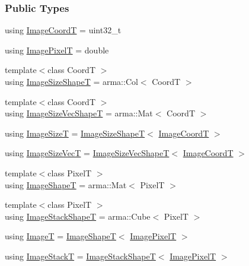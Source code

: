 \subsubsection*{Public Types}
\begin{DoxyCompactItemize}
\item 
using \hyperlink{classmappel_1_1ImageFormat2DBase_a45e9234d63c357f34ca56c72c12b9e9c}{Image\+CoordT} = uint32\+\_\+t
\item 
using \hyperlink{classmappel_1_1ImageFormat2DBase_af6bae6f78398ab1eacb39726a05adeef}{Image\+PixelT} = double
\item 
{\footnotesize template$<$class CoordT $>$ }\\using \hyperlink{classmappel_1_1ImageFormat2DBase_a23c1a9e9f1482852aa0cf4951efe7c48}{Image\+Size\+ShapeT} = arma\+::\+Col$<$ CoordT $>$
\item 
{\footnotesize template$<$class CoordT $>$ }\\using \hyperlink{classmappel_1_1ImageFormat2DBase_afe9ededf04942330121003e3dd8f9311}{Image\+Size\+Vec\+ShapeT} = arma\+::\+Mat$<$ CoordT $>$
\item 
using \hyperlink{classmappel_1_1ImageFormat2DBase_a49cccf61eb2a768a202634d27fcd81d5}{Image\+SizeT} = \hyperlink{classmappel_1_1ImageFormat2DBase_a23c1a9e9f1482852aa0cf4951efe7c48}{Image\+Size\+ShapeT}$<$ \hyperlink{classmappel_1_1ImageFormat2DBase_a45e9234d63c357f34ca56c72c12b9e9c}{Image\+CoordT} $>$
\item 
using \hyperlink{classmappel_1_1ImageFormat2DBase_aa88536c52195a927cf32558856f05a13}{Image\+Size\+VecT} = \hyperlink{classmappel_1_1ImageFormat2DBase_afe9ededf04942330121003e3dd8f9311}{Image\+Size\+Vec\+ShapeT}$<$ \hyperlink{classmappel_1_1ImageFormat2DBase_a45e9234d63c357f34ca56c72c12b9e9c}{Image\+CoordT} $>$
\item 
{\footnotesize template$<$class PixelT $>$ }\\using \hyperlink{classmappel_1_1ImageFormat2DBase_ac40fc3773b5668601c63905876cca732}{Image\+ShapeT} = arma\+::\+Mat$<$ PixelT $>$
\item 
{\footnotesize template$<$class PixelT $>$ }\\using \hyperlink{classmappel_1_1ImageFormat2DBase_ae2e123c8a5a5ab00f89eaea04d2431cb}{Image\+Stack\+ShapeT} = arma\+::\+Cube$<$ PixelT $>$
\item 
using \hyperlink{classmappel_1_1ImageFormat2DBase_a667ea5016648958e507e7db8eaa041b0}{ImageT} = \hyperlink{classmappel_1_1ImageFormat2DBase_ac40fc3773b5668601c63905876cca732}{Image\+ShapeT}$<$ \hyperlink{classmappel_1_1ImageFormat2DBase_af6bae6f78398ab1eacb39726a05adeef}{Image\+PixelT} $>$
\item 
using \hyperlink{classmappel_1_1ImageFormat2DBase_a8f0276e94ff242fa4740a718642f5e14}{Image\+StackT} = \hyperlink{classmappel_1_1ImageFormat2DBase_ae2e123c8a5a5ab00f89eaea04d2431cb}{Image\+Stack\+ShapeT}$<$ \hyperlink{classmappel_1_1ImageFormat2DBase_af6bae6f78398ab1eacb39726a05adeef}{Image\+PixelT} $>$
\end{DoxyCompactItemize}
